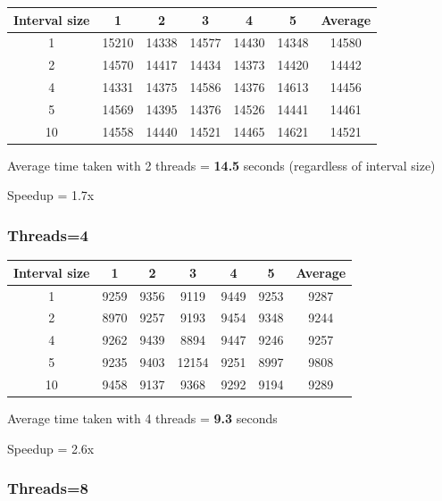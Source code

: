 \documentclass[12pt,letterpaper]{article}
\begin{document}
\begin{center}
\begin{tabular}{c c c c c c c}
\hline
Interval size	&	1		&	2		&	3		&	4		&	5 		& Average	\\
\hline
1				&	15210	&	14338	& 	14577	&	14430	&	14348 	&	14580 \\
2				&	14570	&	14417	&	14434	&	14373	&	14420 	&	14442 \\
4				&	14331	&	14375	&	14586	&	14376	& 	14613 	&	14456 \\
5				&	14569	&	14395	&	14376	&	14526	&	14441 	&	14461 \\
10				&	14558	&	14440	&	14521	&	14465	&	14621 	&	14521 \\
\hline
\end{tabular}
\end{center}

Average time taken with 2 threads = \textbf{14.5} seconds (regardless of interval size)

Speedup = 1.7x

\newpage

\subsubsection{Threads=4}

\begin{center}
\begin{tabular}{c c c c c c c}
\hline
Interval size	&	1		&	2		&	3		&	4		&	5 		& Average	\\
\hline
1				&	9259	&	9356	& 	9119	&	9449	&	9253 	&	9287\\
2				&	8970	&	9257	&	9193	&	9454	&	9348 	&	9244\\
4				&	9262	&	9439	&	8894	&	9447	& 	9246 	&	9257\\
5				&	9235	&	9403	&	12154	&	9251	&	8997 	&	9808\\
10				&	9458	&	9137	&	9368	&	9292	&	9194 	&	9289\\
\hline
\end{tabular}
\end{center}

Average time taken with 4 threads = \textbf{9.3} seconds

Speedup = 2.6x

\subsubsection{Threads=8}
\end{document}
